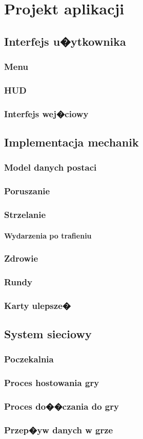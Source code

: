 \chapter{Projekt aplikacji}

\section{Interfejs u�ytkownika}
\subsection{Menu}
\subsection{HUD}
\subsection{Interfejs wej�ciowy}


\section{Implementacja mechanik}
\subsection{Model danych postaci}
\subsection{Poruszanie}
\subsection{Strzelanie}
\subsubsection{Wydarzenia po trafieniu}
\subsection{Zdrowie}
\subsection{Rundy}
\subsection{Karty ulepsze�}


\section{System sieciowy}
\subsection{Poczekalnia}
\subsection{Proces hostowania gry}
\subsection{Proces do��czania do gry}
\subsection{Przep�yw danych w grze}